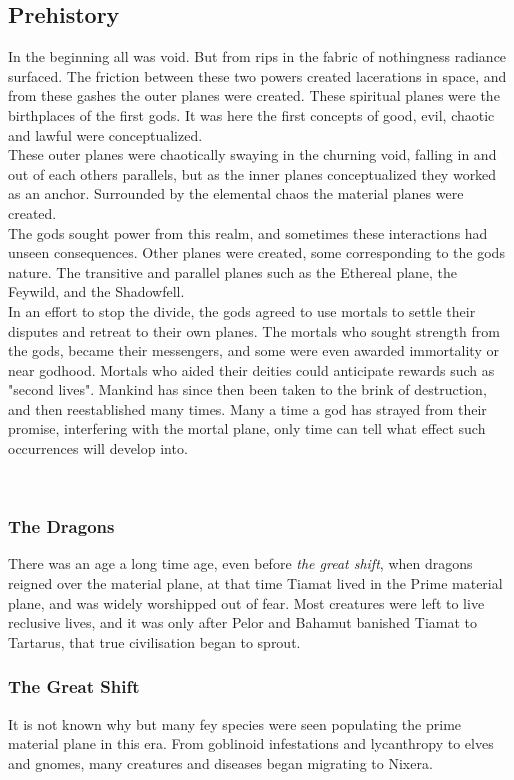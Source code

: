 \documentclass[a4paper]{article}
\begin{document}
\subsection{Prehistory}
In the beginning all was void. But from rips in the fabric of nothingness radiance surfaced. The friction between these two powers created lacerations in space, and from these gashes the outer planes were created. These spiritual planes were the birthplaces of the first gods. It was here the first concepts of good, evil, chaotic and lawful were conceptualized.\\
These outer planes were chaotically swaying in the churning void, falling in and out of each others parallels, but as the inner planes conceptualized they worked as an anchor. Surrounded by the elemental chaos the material planes were created.\\
The gods sought power from this realm, and sometimes these interactions had unseen consequences. Other planes were created, some corresponding to the gods nature. The transitive and parallel planes such as the Ethereal plane, the Feywild, and the Shadowfell.\\
In an effort to stop the divide, the gods agreed to use mortals to settle their disputes and retreat to their own planes. The mortals who sought strength from the gods, became their messengers, and some were even awarded immortality or near godhood. Mortals who aided their deities could anticipate rewards such as "second lives". Mankind has since then been taken to the brink of destruction, and then reestablished many times. Many a time a god has strayed from their promise, interfering with the mortal plane, only time can tell what effect such occurrences will develop into.

\\
\subsubsection{The Dragons}
There was an age a long time age, even before \textit{the great shift}, when dragons reigned over the material plane, at that time Tiamat lived in the Prime material plane, and was widely worshipped out of fear. Most creatures were left to live reclusive lives, and it was only after Pelor and Bahamut banished Tiamat to Tartarus, that true civilisation began to sprout.

\subsubsection{The Great Shift}
It is not known why but many fey species were seen populating the prime material plane in this era. From goblinoid infestations and lycanthropy to elves and gnomes, many creatures and diseases began migrating to Nixera. 
\end{document}
